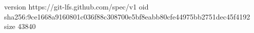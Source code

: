 version https://git-lfs.github.com/spec/v1
oid sha256:9ce1668a9160801c036f88c308700e5bf8eabb80cfe44975bb2751dec45f4192
size 43840
